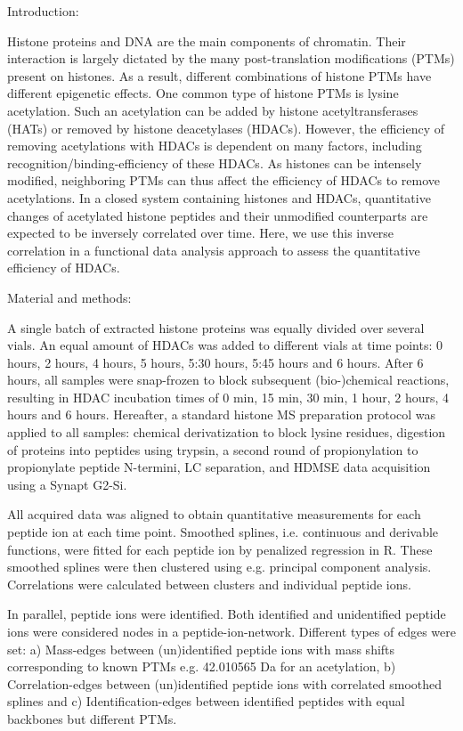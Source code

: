Introduction:

Histone proteins and DNA are the main components of chromatin. Their interaction is largely dictated by the many post-translation modifications (PTMs) present on histones. As a result, different combinations of histone PTMs have different epigenetic effects.
One common type of histone PTMs is lysine acetylation. Such an acetylation can be added by histone acetyltransferases (HATs) or removed by histone deacetylases (HDACs). However, the efficiency of removing acetylations with HDACs is dependent on many factors, including recognition/binding-efficiency of these HDACs. As histones can be intensely modified, neighboring PTMs can thus affect the efficiency of HDACs to remove acetylations.
In a closed system containing histones and HDACs, quantitative changes of acetylated histone peptides and their unmodified counterparts are expected to be inversely correlated over time. Here, we use this inverse correlation in a functional data analysis approach to assess the quantitative efficiency of HDACs.


Material and methods:

A single batch of extracted histone proteins was equally divided over several vials. An equal amount of HDACs was added to different vials at time points: 0 hours, 2 hours, 4 hours, 5 hours, 5:30 hours, 5:45 hours and 6 hours. After 6 hours, all samples were snap-frozen to block subsequent (bio-)chemical reactions, resulting in HDAC incubation times of 0 min, 15 min, 30 min, 1 hour, 2 hours, 4 hours and 6 hours. Hereafter, a standard histone MS preparation protocol was applied to all samples: chemical derivatization to block lysine residues, digestion of proteins into peptides using trypsin, a second round of propionylation to propionylate peptide N-termini, LC separation, and HDMSE data acquisition using a Synapt G2-Si.

All acquired data was aligned to obtain quantitative measurements for each peptide ion at each time point. Smoothed splines, i.e. continuous and derivable functions, were fitted for each peptide ion by penalized regression in R. These smoothed splines were then clustered using e.g. principal component analysis. Correlations were calculated between clusters and individual peptide ions.

In parallel, peptide ions were identified. Both identified and unidentified peptide ions were considered nodes in a peptide-ion-network. Different types of edges were set: a) Mass-edges between (un)identified peptide ions with mass shifts corresponding to known PTMs e.g. 42.010565 Da for an acetylation, b) Correlation-edges between (un)identified peptide ions with correlated smoothed splines and c) Identification-edges between identified peptides with equal backbones but different PTMs.



